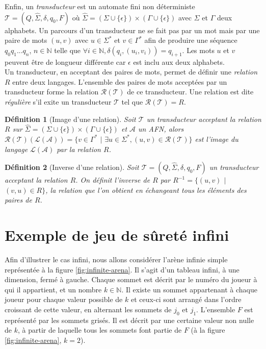 \documentclass[12pt,a4paper,oneside,titlepage]{report}
\newtheorem{defi}{D\'efinition}[section]
\begin{document}
\noindent Enfin, un \emph{transducteur} est un automate fini non déterministe $\mathcal{T}=(Q,\hat{\Sigma},\delta,q_0,F)$ où $\hat{\Sigma}=(\Sigma\cup\{\epsilon\})\times(\Gamma\cup\{\epsilon\})$ avec $\Sigma$ et $\Gamma$ deux alphabets. Un parcours d'un transducteur ne se fait pas par un mot mais par une paire de mots $(u,v)$ avec $u\in\Sigma^*$ et $v\in\Gamma^*$ afin de produire une séquence $q_0q_1...q_n$, $n\in\mathbb{N}$ telle que $\forall i\in\mathbb{N}, \delta(q_i,(u_i,v_i))=q_{i+1}$. Les mots $u$ et $v$ peuvent être de longueur différente car $\epsilon$ est inclu aux deux alphabets.\\
Un transducteur, en acceptant des paires de mots, permet de définir une \emph{relation} $R$ entre deux langages. L'ensemble des paires de mots acceptées par un transducteur forme la relation $\mathcal{R}(\mathcal{T})$ de ce transducteur. Une relation est dite \emph{régulière} s'il exite un transducteur $\mathcal{T}$ tel que $\mathcal{R}(\mathcal{T})=R$.
\begin{defi}[Image d'une relation]
Soit $\mathcal{T}$ un transducteur acceptant la relation $R$ sur $\hat{\Sigma}=(\Sigma\cup\{\epsilon\})\times(\Gamma\cup\{\epsilon\})$ et $\mathcal{A}$ un AFN, alors\\ $\mathcal{R}(\mathcal{T})(\mathcal{L}(\mathcal{A}))=\{v\in\Gamma^*$ $|$ $\exists u\in\Sigma^*, (u,v)\in\mathcal{R}(\mathcal{T})\}$ est l'image du langage $\mathcal{L}(\mathcal{A})$ par la relation $R$.
\end{defi}
\begin{defi}[Inverse d'une relation]
Soit $\mathcal{T}=(Q,\hat{\Sigma},\delta,q_0,F)$ un transducteur acceptant la relation $R$. On définit l'inverse de $R$ par $R^{-1}=\{(u,v)$ $|$ $(v,u)\in R\}$, la relation que l'on obtient en échangeant tous les éléments des paires de $R$.
\end{defi}

\section{Exemple de jeu de sûreté infini}
Afin d'illustrer le cas infini, nous allons considérer l'arène infinie simple représentée à la figure \ref{fig:infinite-arena}. Il s'agit d'un tableau infini, à une dimension, fermé à gauche. Chaque sommet est décrit par le numéro du joueur à qui il appartient, et un nombre $k\in\mathbb{N}$. Il existe un sommet appartenant à chaque joueur pour chaque valeur possible de $k$ et ceux-ci sont arrangé dans l'ordre croissant de cette valeur, en alternant les sommets de $j_0$ et $j_1$. L'ensemble $F$ est représenté par les sommets grisés. Il est décrit par une certaine valeur non nulle de $k$, à partir de laquelle tous les sommets font partie de $F$ (à la figure \ref{fig:infinite-arena}, $k=2$).
\end{document}
